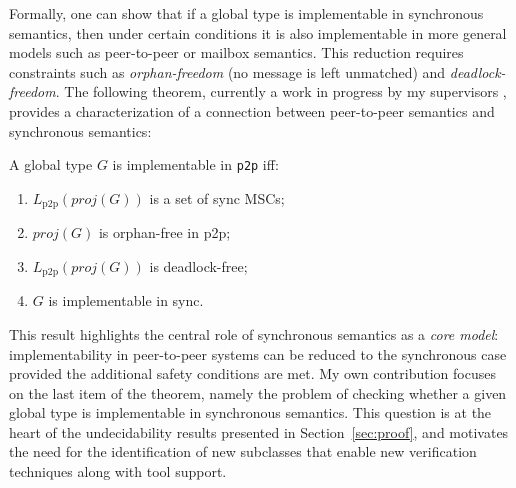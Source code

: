 Formally, one can show that if a global type is implementable in 
synchronous semantics, then under certain conditions it is also 
implementable in more general models such as peer-to-peer or mailbox 
semantics. This reduction requires constraints such as 
\emph{orphan-freedom} (no message is left unmatched) and
\emph{deadlock-freedom}.
The following theorem, currently a work in progress by my supervisors \cite{di2025realisability}, 
provides a characterization of a connection between 
peer-to-peer semantics and synchronous semantics:

\begin{theorem}
	A global type $G$ is implementable in \verb|p2p| iff:
	\begin{enumerate}
		\item $L_{\text{p2p}}(proj(G))$ is a set of sync MSCs;
		\item $proj(G)$ is orphan-free in p2p;
		\item $L_{\text{p2p}}(proj(G))$ is deadlock-free;
		\item $G$ is implementable in sync.
	\end{enumerate}
\end{theorem}

This result highlights the central role of synchronous semantics as a 
\emph{core model}: implementability in peer-to-peer systems 
can be reduced to the synchronous case provided the additional safety 
conditions are met. My own contribution focuses on the last item of the 
theorem, namely the problem of checking whether a given global type is 
implementable in synchronous semantics. This question is at the heart 
of the undecidability results presented in Section~\ref{sec:proof}, 
and motivates the need for the identification of new subclasses that 
enable new verification techniques along with tool support.